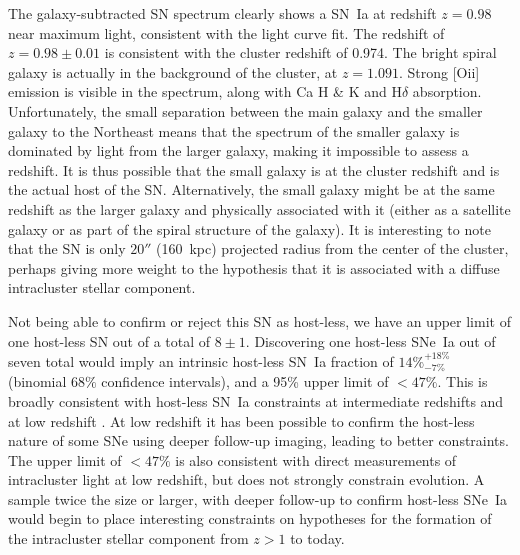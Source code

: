 The galaxy-subtracted SN spectrum clearly shows a SN~Ia at redshift
$z=0.98$ near maximum light, consistent with the light curve
fit. The redshift of $z=0.98 \pm 0.01$ is consistent with the cluster
redshift of 0.974.  The bright spiral galaxy is actually in the
background of the cluster, at $z=1.091$. Strong [O{\sc ii}] emission
is visible in the spectrum, along with Ca H \& K and H$\delta$
absorption. Unfortunately, the small separation between the main
galaxy and the smaller galaxy to the Northeast means that the spectrum
of the smaller galaxy is dominated by light from the larger galaxy,
making it impossible to assess a redshift. It is thus possible that
the small galaxy is at the cluster redshift and is the actual host of
the SN. Alternatively, the small galaxy might be at the same redshift
as the larger galaxy and physically associated with it (either as a
satellite galaxy or as part of the spiral structure of the galaxy). It
is interesting to note that the SN is only $20''$ (160~kpc) projected
radius from the center of the cluster, perhaps giving more weight to
the hypothesis that it is associated with a diffuse intracluster
stellar component.


Not being able to confirm or reject this SN as host-less, we have an
upper limit of one host-less SN out of a total of $8 \pm
1$. Discovering one host-less SNe~Ia out of seven total would imply an
intrinsic host-less SN~Ia fraction of $14\% ^{+18\%}_{-7\%}$ (binomial
$68\%$ confidence intervals), and a 95\% upper limit of $<47\%$. This
is broadly consistent with host-less SN~Ia constraints at intermediate
redshifts \citep{sharon10a} and at low redshift
\citep{galyam03a,sand10a}. At low redshift it has been possible to
confirm the host-less nature of some SNe using deeper follow-up
imaging, leading to better constraints. The upper limit of $<47\%$ is
also consistent with direct measurements of intracluster light at low
redshift, but does not strongly constrain evolution. A sample twice
the size or larger, with deeper follow-up to confirm host-less SNe~Ia
would begin to place interesting constraints on hypotheses for the
formation of the intracluster stellar component from $z>1$ to today.

